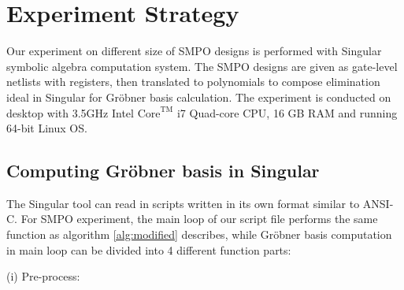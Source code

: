 \section{Experiment Strategy}
Our experiment on different size of SMPO designs is performed with Singular symbolic algebra computation system.
The SMPO designs are given as gate-level netlists with registers, then translated to polynomials to compose
elimination ideal in Singular for Gr\"obner basis calculation. The experiment is conducted on desktop with
3.5GHz Intel $\text{Core}^\text{TM}$ i7 Quad-core CPU, 16 GB RAM and running 64-bit Linux OS.

\subsection{Computing Gr\"obner basis in Singular}
The Singular tool can read in scripts written in its own format similar to ANSI-C. For SMPO experiment, the main 
loop of our script file performs the same function as algorithm \ref{alg:modified} describes, while Gr\"obner basis
computation in main loop can be divided into 4 different function parts:

(i) Pre-process:

